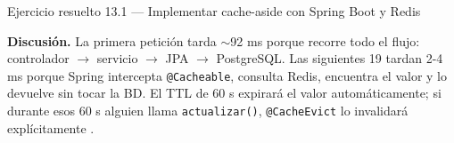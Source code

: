 \documentclass[11pt,a4paper,openany]{book}
\begin{document}
\begin{cajaejemplo}{Ejercicio resuelto 13.1 --- Implementar cache-aside con Spring Boot y Redis}
\begin{center}
\end{center}

\textbf{Discusión.} La primera petición tarda $\sim$92 ms porque
recorre todo el flujo: controlador $\to$ servicio $\to$ JPA $\to$
PostgreSQL. Las siguientes 19 tardan 2-4 ms porque Spring intercepta
\texttt{@Cacheable}, consulta Redis, encuentra el valor y lo devuelve
sin tocar la BD. El TTL de 60 s expirará el valor automáticamente; si
durante esos 60 s alguien llama \texttt{actualizar()},
\texttt{@CacheEvict} lo invalidará explícitamente
\cite{kleppmann2017designing}.
\end{cajaejemplo}
\end{document}
